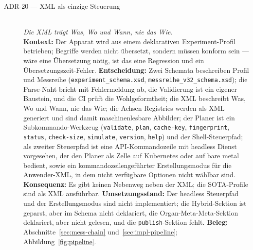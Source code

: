 \begin{description}
  \item[ADR-20 --- XML als einzige Steuerung]\hfill\\
  \emph{Die XML trägt Was, Wo und Wann, nie das Wie.}\hfill\\
  \textbf{Kontext:} Der Apparat wird aus einem deklarativen Experiment-Profil betrieben; Begriffe
  werden nicht übersetzt, sondern müssen konform sein --- wäre eine Übersetzung nötig, ist das eine
  Regression und ein Übersetzungszeit-Fehler.
  \textbf{Entscheidung:} Zwei Schemata beschreiben Profil und Messreihe
  (\texttt{experiment\_schema.xsd}, \texttt{messreihe\_v32\_schema.xsd}); die Parse-Naht bricht mit Fehlermeldung
  ab, die Validierung ist ein eigener Baustein, und die CI prüft die Wohlgeformtheit; die XML beschreibt
  Was, Wo und Wann, nie das Wie; die Achsen-Registries werden als XML generiert und sind damit
  maschinenlesbare Abbilder; der Planer ist ein Subkommando-Werkzeug (\texttt{validate},
  \texttt{plan}, \texttt{cache-key}, \texttt{fingerprint}, \texttt{status}, \texttt{check-size},
  \texttt{simulate}, \texttt{version}, \texttt{help}) und der Shell-Steuerpfad; als zweiter Steuerpfad ist eine
  API-Kommandozeile mit headless Dienst vorgesehen, der den Planer als Zelle auf Kubernetes oder auf
  bare metal bedient, sowie ein kommandozeilengeführter Erstellungsmodus für die Anwender-XML, in dem
  nicht verfügbare Optionen nicht wählbar sind.
  \textbf{Konsequenz:} Es gibt keinen Nebenweg neben der XML\@; die SOTA-Profile sind als XML
  ausführbar.
  \textbf{Umsetzungsstand:} Der headless Steuerpfad und der Erstellungsmodus sind nicht implementiert;
  die Hybrid-Sektion ist geparst, aber im Schema nicht deklariert, die
  Organ-Meta-Meta-Sektion deklariert, aber nicht gelesen, und die \texttt{publish}-Sektion fehlt.
  \textbf{Beleg:} Abschnitte~\ref{sec:mess-chain} und~\ref{sec:impl-pipeline};
  Abbildung~\ref{fig:pipeline}.

\end{description}
